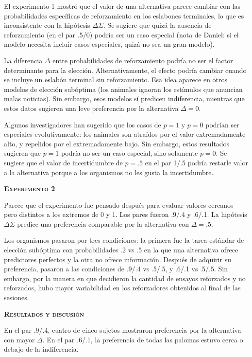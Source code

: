 \documentclass[a4paper,12pt]{article}
\begin{document}
El experimento 1 mostró que el valor de una alternativa parece cambiar con las probabilidades específicas de reforzamiento en los eslabones terminales, lo que es inconsistente con la hipótesis $\Delta\Sigma$. Se sugiere que quizá la ausencia de reforzamiento (en el par .5/0) podría ser un caso especial (nota de Daniel: si el modelo necesita incluir casos especiales, quizá no sea un gran modelo).

La diferencia $\Delta$ entre probabilidades de reforzamiento podría no ser el factor determinante para la elección. Alternativamente, el efecto podría cambiar cuando se incluye un eslabón terminal sin reforzamiento. Esa idea aparece en otros modelos de elección subóptima (los animales ignoran los estímulos que anuncian malas noticias). Sin embargo, esos modelos sí predicen indiferencia, mientras que estos datos sugieren una leve preferencia por la alternativa $\Delta=0$.

Algunos investigadores han sugerido que los casos de $p=1$ y $p=0$ podrían ser especiales evolutivamente: los animales son atraídos por el valor extremadamente alto, y repelidos por el extremadamente bajo. Sin embargo, estos resultados sugieren que $p=1$ podría no ser un caso especial, sino solamente $p=0$. Se sugiere que el valor de incertidumbre de $p={.}5$ en el par 1/.5 podría restarle valor a la alternativa porque a los organismos no les gusta la incertidumbre.

{\scshape\bfseries Experimento 2}

Parece que el experimento fue pensado después para evaluar valores cercanos pero distintos a los extremos de 0 y 1. Los pares fueron .9/.4 y .6/.1. La hipótesis $\Delta\Sigma$ predice una preferencia comparable por la alternativa con $\Delta={.}5$.

Los organismos pasaron por tres condiciones: la primera fue la tarea estándar de elección subóptima con probabilidades .2 vs .5 en la que una alternativa ofrece predictores perfectos y la otra no ofrece información. Después de adquirir su preferencia, pasaron a las condiciones de .9/.4 vs .5/.5, y .6/.1 vs .5/.5. Sin embargo, por la manera en que decidieron la cantidad de ensayos reforzados y no reforzados, hubo mayor variabilidad en los reforzadores obtenidos al final de las sesiones.

{\scshape\bfseries Resultados y discusión}

En el par .9/.4, cuatro de cinco sujetos mostraron preferencia por la alternativa con mayor $\Delta$. En el par .6/.1, la preferencia de todas las palomas estuvo cerca o debajo de la indiferencia.
\end{document}

